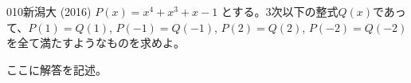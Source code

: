 \begin{thm}{010}{}{新潟大 (2016)}
 $P(x)=x^4+x^3+x-1$ とする。3次以下の整式$Q(x)$であって、$P(1)=Q(1)$, $P(-1)=Q(-1)$, $P(2)=Q(2)$, $P(-2)=Q(-2)$ を全て満たすようなものを求めよ。
\end{thm}

ここに解答を記述。